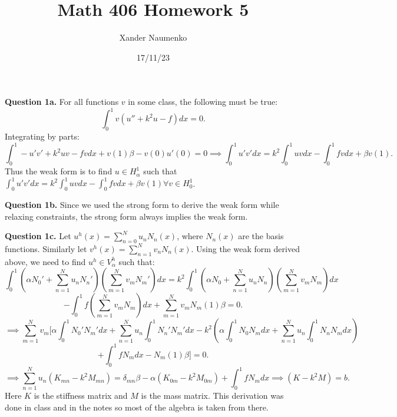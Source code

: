 \documentclass[letterpaper, reqno,11pt]{article}
\begin{document}
\title{Math 406 Homework 5}
\date{17/11/23}
\author{Xander Naumenko}
\maketitle

{\medskip\noindent\bf Question 1a.} For all functions $v$ in some class, the following must be true:
\[
\int_{0}^{1}v(u''+k^2u-f)dx=0
.\]
Integrating by parts:
\[
\int_0^{1}-u'v'+k^2uv-fvdx+v(1)\beta-v(0)u'(0)=0\implies \int_0^{1}u'v'dx=k^2\int_0^{1}uvdx-\int_0^{1}fvdx+\beta v(1)
.\]
Thus the weak form is to find $u\in H_\alpha^{1}$ such that $\int_0^{1}u'v'dx=k^2\int_0^{1}uvdx-\int_0^{1}fvdx+\beta v(1)\forall v\in H_0^{1}$.

{\medskip\noindent\bf Question 1b.} Since we used the strong form to derive the weak form while relaxing constraints, the strong form always implies the weak form. 

{\medskip\noindent\bf Question 1c.} Let $u^{h}(x)=\sum_{n=0}^{N}u_nN_n(x)$, where $N_n(x)$ are the basis functions. Similarly let $v^{h}(x)=\sum_{n=1}^{N}v_nN_n(x)$. Using the weak form derived above, we need to find $u^{h}\in V_\alpha^{h}$ such that:
\[
\int_0^{1}\left(\alpha N_0'+\sum_{n=1}^{N}u_nN_n'\right)\left( \sum_{m=1}^{N}v_mN_m' \right) dx=k^2\int_0^{1}\left( \alpha N_0+\sum_{n=1}^{N}u_nN_n \right) \left( \sum_{m=1}^{N}v_mN_m \right) dx
\]
\[
-\int_0^{1}f\left( \sum_{m=1}^{N}v_mN_m \right) dx+\sum_{m=1}^{N}v_m N_m(1)\beta=0
.\]
\[
    \implies\sum_{m=1}^{N}v_m\bigg[\alpha\int_0^{1}N_0' N_m'dx+\sum_{n=1}^{N}u_n\int_0^{1}N_n' N_m'dx-k^2\left( \alpha\int_0^{1} N_0 N_m dx+\sum_{n=1}^{N}u_n\int_0^{1}N_n N_m dx \right) 
\]
\[
+\int_0^{1}fN_mdx-N_m(1)\beta\bigg]=0
.\]
\[
\implies\sum_{n=1}^{N}u_n(K_{mn}-k^2M_{mn})=\delta_{mn}\beta-\alpha(K_{0m}-k^2M_{0m})+\int_0^{1}fN_mdx\implies (K-k^2M)=b
.\]
Here $K$ is the stiffness matrix and $M$ is the mass matrix. This derivation was done in class and in the notes so most of the algebra is taken from there.
\end{document}
